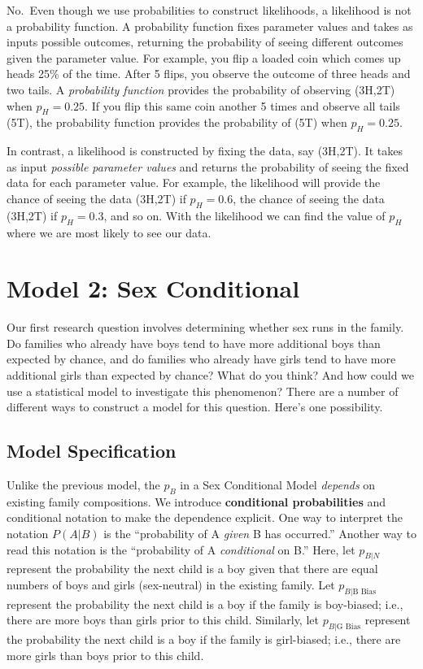 \documentclass[
]{krantz}
\newcommand{\neutral}{p_{B|N}}
\newcommand{\gbias}{p_{B|\textrm{G Bias}}}
\newcommand{\bbias}{p_{B|\textrm{B Bias}}}
\begin{document}
No.~Even though we use probabilities to construct likelihoods, a likelihood is not a probability function. A probability function fixes parameter values and takes as inputs possible outcomes, returning the probability of seeing different outcomes given the parameter value. For example, you flip a loaded coin which comes up heads 25\% of the time. After 5 flips, you observe the outcome of three heads and two tails. A \emph{probability function} provides the probability of observing (3H,2T) when \(p_H=0.25\). If you flip this same coin another 5 times and observe all tails (5T), the probability function provides the probability of (5T) when \(p_H=0.25\).

In contrast, a likelihood is constructed by fixing the data, say (3H,2T). It takes as input \emph{possible parameter values} and returns the probability of seeing the fixed data for each parameter value. For example, the likelihood will provide the chance of seeing the data (3H,2T) if \(p_H=0.6\), the chance of seeing the data (3H,2T) if \(p_H=0.3\), and so on. With the likelihood we can find the value of \(p_H\) where we are most likely to see our data.

\hypertarget{sex_conditional.sec}{%
\section{Model 2: Sex Conditional}\label{sex_conditional.sec}}

Our first research question involves determining whether sex runs in the family. Do families who already have boys tend to have more additional boys than expected by chance, and do families who already have girls tend to have more additional girls than expected by chance? What do you think? And how could we use a statistical model to investigate this phenomenon? There are a number of different ways to construct a model for this question. Here's one possibility.

\hypertarget{model-specification}{%
\subsection{Model Specification}\label{model-specification}}

Unlike the previous model, the \(p_B\) in a Sex Conditional Model \emph{depends} on existing family compositions. We introduce \textbf{conditional probabilities}  and conditional notation to make the dependence explicit. One way to interpret the notation \(P(A|B)\) is the ``probability of A \emph{given} B has occurred.'' Another way to read this notation is the ``probability of A \emph{conditional} on B.'' Here, let \(\neutral\) represent the probability the next child is a boy given that there are equal numbers of boys and girls (sex-neutral) in the existing family. Let \(\bbias\) represent the probability the next child is a boy if the family is boy-biased; i.e., there are more boys than girls prior to this child. Similarly, let \(\gbias\) represent the probability the next child is a boy if the family is girl-biased; i.e., there are more girls than boys prior to this child.
\end{document}
